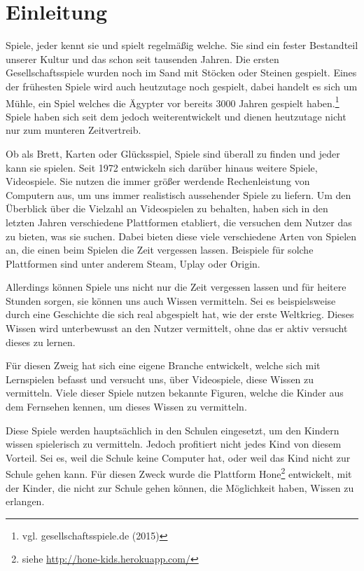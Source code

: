 \chapter{Einleitung}


Spiele, jeder kennt sie und spielt regelmäßig welche. Sie sind ein fester Bestandteil unserer Kultur und das schon seit tausenden Jahren. Die ersten Gesellschaftsspiele wurden noch im Sand mit Stöcken oder Steinen gespielt. Eines der frühesten Spiele wird auch heutzutage noch gespielt, dabei handelt es sich um Mühle, ein Spiel welches die Ägypter vor bereits 3000 Jahren gespielt haben.\footnote{vgl. gesellschaftsspiele.de \cite{spiele} (2015)} Spiele haben sich seit dem jedoch weiterentwickelt und dienen heutzutage nicht nur zum munteren Zeitvertreib. 

Ob als Brett, Karten oder Glücksspiel, Spiele sind überall zu finden und jeder kann sie spielen. Seit 1972 entwickeln sich darüber hinaus weitere Spiele, Videospiele. Sie nutzen die immer größer werdende Rechenleistung von Computern aus, um uns immer realistisch aussehender Spiele zu liefern. 
Um den Überblick über die Vielzahl an Videospielen zu behalten, haben sich in den letzten Jahren verschiedene Plattformen etabliert, die versuchen dem Nutzer das zu bieten, was sie suchen. Dabei bieten diese viele verschiedene Arten von Spielen an, die einen beim Spielen die Zeit vergessen lassen. Beispiele für solche Plattformen sind unter anderem Steam, Uplay oder Origin.

Allerdings können Spiele uns nicht nur die Zeit vergessen lassen und für heitere Stunden sorgen, sie können uns auch Wissen vermitteln. Sei es beispielsweise durch eine Geschichte die sich real abgespielt hat, wie der erste Weltkrieg. Dieses Wissen wird unterbewusst an den Nutzer vermittelt, ohne das er aktiv versucht dieses zu lernen.

Für diesen Zweig hat sich eine eigene Branche entwickelt, welche sich mit Lernspielen befasst und versucht uns, über Videospiele, diese Wissen zu vermitteln. Viele dieser Spiele nutzen bekannte Figuren, welche die Kinder aus dem Fernsehen kennen, um dieses Wissen zu vermitteln.

Diese Spiele werden hauptsächlich in den Schulen eingesetzt, um den Kindern wissen spielerisch zu vermitteln. Jedoch profitiert nicht jedes Kind von diesem Vorteil. Sei es, weil die Schule keine Computer hat, oder weil das Kind nicht zur Schule gehen kann. Für diesen Zweck wurde die Plattform Hone\footnote{siehe \url{http://hone-kids.herokuapp.com/}} entwickelt, mit der Kinder, die nicht zur Schule gehen können, die Möglichkeit haben, Wissen zu erlangen. 

